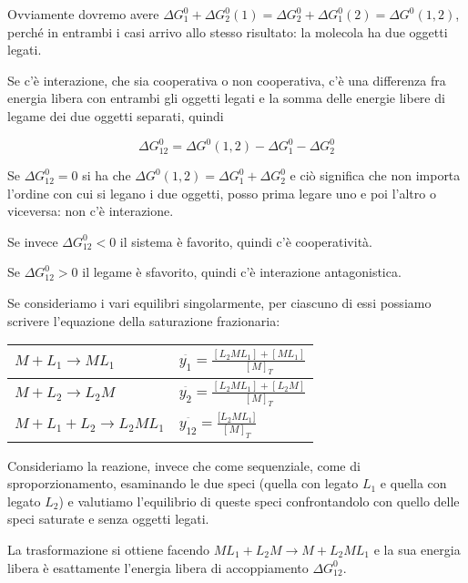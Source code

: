 Ovviamente dovremo avere
\(\Delta G_{1}^{0} + \Delta G_{2}^{0}\left( 1 \right) = \Delta G_{2}^{0} + \Delta G_{1}^{0}\left( 2 \right) = \Delta G^{0}\left( 1,2 \right)\),
perché in entrambi i casi arrivo allo stesso risultato: la molecola ha
due oggetti legati.

Se c'è interazione, che sia cooperativa o non cooperativa, c'è una
differenza fra energia libera con entrambi gli oggetti legati e la somma
delle energie libere di legame dei due oggetti separati, quindi

\[\Delta G_{12}^{0} = \Delta G^{0}\left( 1,2 \right) - \Delta G_{1}^{0} - \Delta G_{2}^{0}\]

Se \(\Delta G_{12}^{0} = 0\) si ha che
\(\Delta G^{0}\left( 1,2 \right) = \Delta G_{1}^{0} + \Delta G_{2}^{0}\)
e ciò significa che non importa l'ordine con cui si legano i due
oggetti, posso prima legare uno e poi l'altro o viceversa: non c'è
interazione.

Se invece \(\Delta G_{12}^{0} < 0\) il sistema è favorito, quindi c'è
cooperatività.

Se \(\Delta G_{12}^{0} > 0\) il legame è sfavorito, quindi c'è
interazione antagonistica.

Se consideriamo i vari equilibri singolarmente, per ciascuno di essi
possiamo scrivere l'equazione della saturazione frazionaria:

\begin{longtable}[c]{@{}ll@{}}
\toprule
\(M + L_{1} \rightarrow ML_{1}\) &
\(\overset{\overline{}}{y_{1}} = \frac{\left\lbrack L_{2}ML_{1} \right\rbrack + \left\lbrack ML_{1} \right\rbrack}{\left\lbrack M \right\rbrack_{T}}\)\tabularnewline
\midrule
\endhead
\(M + L_{2} \rightarrow L_{2}M\) &
\(\overset{\overline{}}{y_{2}} = \frac{\left\lbrack L_{2}ML_{1} \right\rbrack + \left\lbrack L_{2}M \right\rbrack}{\left\lbrack M \right\rbrack_{T}}\)\tabularnewline
\(M + L_{1} + L_{2} \rightarrow L_{2}ML_{1}\) &
\(\overset{\overline{}}{y_{12}} = \frac{\lbrack L_{2}ML_{1}\rbrack}{\left\lbrack M \right\rbrack_{T}}\)\tabularnewline
\bottomrule
\end{longtable}

Consideriamo la reazione, invece che come sequenziale, come di
sproporzionamento, esaminando le due speci (quella con legato \(L_{1}\)
e quella con legato \(L_{2}\)) e valutiamo l'equilibrio di queste speci
confrontandolo con quello delle speci saturate e senza oggetti legati.

La trasformazione si ottiene facendo
\(ML_{1} + L_{2}M \rightarrow M + L_{2}ML_{1}\) e la sua energia libera
è esattamente l'energia libera di accoppiamento \(\Delta G_{12}^{0}\).

